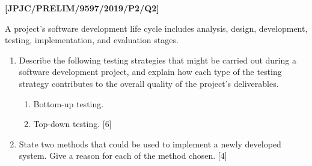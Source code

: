 \item \textbf{{[}JPJC/PRELIM/9597/2019/P2/Q2{]} }

A project\textquoteright s software development life cycle includes
analysis, design, development, testing, implementation, and evaluation
stages.
\begin{enumerate}
\item Describe the following testing strategies that might be carried out
during a software development project, and explain how each type of
the testing strategy contributes to the overall quality of the project\textquoteright s
deliverables. 
\begin{enumerate}
\item Bottom-up testing. 
\item Top-down testing. \hfill{}{[}6{]}
\end{enumerate}
\item State two methods that could be used to implement a newly developed
system. Give a reason for each of the method chosen. \hfill{}{[}4{]}
\end{enumerate}